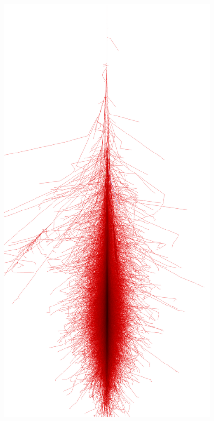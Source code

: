 \documentclass[main.tex]{subfiles}
\begin{document}
\begin{figure}[!htb]
  \includegraphics[width=\linewidth]{Pictures/photon_12_0deg.pdf}
  \endminipage\hfill

\end{figure}
\end{document}
